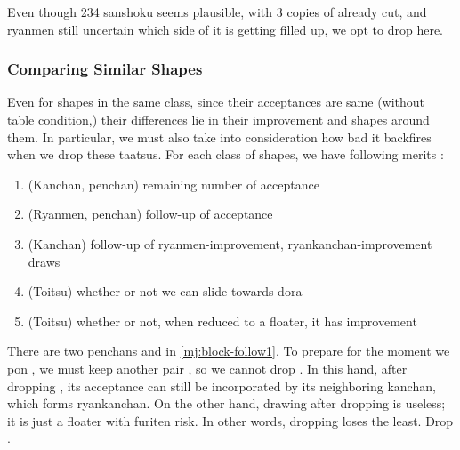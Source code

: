 \documentclass[12pt]{article}
\begin{document}
Even though 234 sanshoku seems plausible, with 3 copies of  already cut, and  ryanmen still uncertain which side of it is getting filled up, we opt to drop  here.

\begin{rittai}[h]
  \centering
  
  
  \caption{}
  \label{rittai:block-16}
\end{rittai}


\subsubsection*{Comparing Similar Shapes}

Even for shapes in the same class, since their acceptances are same (without table condition,) their differences lie in their improvement and shapes around them. In particular, we must also take into consideration how bad it backfires when we drop these taatsus. For each class of shapes, we have following merits :

\begin{enumerate}
\item (Kanchan, penchan) remaining number of acceptance
\item (Ryanmen, penchan) follow-up of acceptance
\item (Kanchan) follow-up of ryanmen-improvement, ryankanchan-improvement draws
\item (Toitsu) whether or not we can slide towards dora
\item (Toitsu) whether or not, when reduced to a floater, it has improvement
\end{enumerate}

There are two penchans  and  in \ref{mj:block-follow1}. To prepare for the moment we pon , we must keep another pair , so we cannot drop . In this hand, after dropping , its acceptance  can still be incorporated by its neighboring kanchan, which forms  ryankanchan. On the other hand, drawing  after dropping  is useless; it is just a floater with furiten risk. In other words, dropping  loses the least. Drop  \citep{yuusee-follow}.
\end{document}
